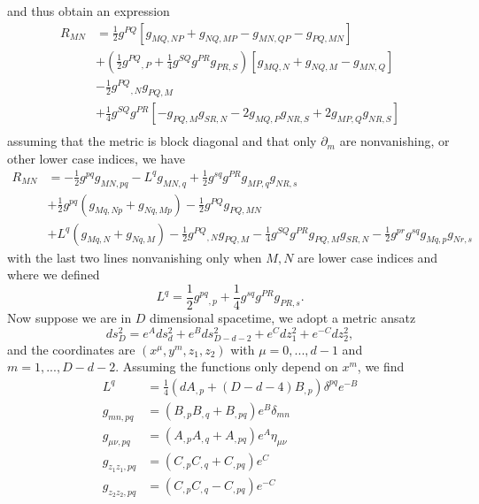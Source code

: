 and thus obtain an expression
\begin{equation}
\begin{aligned}
R_{MN}
&= \frac{1}{2}g^{PQ}[g_{MQ,NP} + g_{NQ,MP} - g_{MN,QP} - g_{PQ,MN}]\\
&+(\frac{1}{2}g^{PQ}{}_{,P} + \frac{1}{4}g^{SQ}g^{PR}g_{PR,S})[g_{MQ,N} + g_{NQ,M} - g_{MN,Q}]\\
&-\frac{1}{2}g^{PQ}{}_{,N}g_{PQ,M}\\
&+\frac{1}{4}g^{SQ}g^{PR}[-g_{PQ,M}g_{SR,N} - 2g_{MQ,P}g_{NR,S} +2g_{MP,Q}g_{NR,S}]\\
\end{aligned}
\end{equation}
assuming that the metric is block diagonal and that only $\partial_m$ are nonvanishing, or other lower case indices, we have
\begin{equation}
\begin{aligned}
R_{MN} &=
-\frac{1}{2}g^{pq}g_{MN,pq}
-L^qg_{MN,q}
+\frac{1}{2}g^{sq}g^{PR}g_{MP,q}g_{NR,s}\\
&+\frac{1}{2}g^{pq}(g_{Mq,Np}+g_{Nq,Mp})-\frac{1}{2}g^{PQ}g_{PQ,MN}\\
&+L^q(g_{Mq,N}+g_{Nq,M})
-\frac{1}{2}g^{PQ}{}_{,N}g_{PQ,M}
-\frac{1}{4}g^{SQ}g^{PR}g_{PQ,M}g_{SR,N}-\frac{1}{2}g^{pr}g^{sq}g_{Mq,p}g_{Nr,s}
\end{aligned}
\end{equation}
with the last two lines nonvanishing only when $M,N$ are lower case indices and where we defined
\begin{equation}
L^q = \frac{1}{2}g^{pq}{}_{,p} + \frac{1}{4}g^{sq}g^{PR}g_{PR,s}.
\end{equation}
Now suppose we are in $D$ dimensional spacetime, we adopt a metric ansatz
\begin{equation}
ds_D^2 = e^A ds_d^2 + e^B ds_{D-d-2}^2 + e^C dz_1^2 + e^{-C} dz_2^2,
\end{equation}
and the coordinates are $(x^{\mu}, y^m, z_1, z_2)$ with $\mu = 0,...,d-1$ and $m = 1,...,D-d-2$.
Assuming the functions only depend on $x^m$, we find
\begin{align}
L^q 
&=
\frac{1}{4}\left(
    dA_{,p} + (D-d-4)B_{,p}
\right)\delta^{pq}e^{-B}\\
g_{mn,pq} 
&= (B_{,p}B_{,q} + B_{,pq})e^{B}\delta_{mn}\\
g_{\mu\nu,pq} 
&= (A_{,p}A_{,q} + A_{,pq})e^{A}\eta_{\mu\nu}\\
g_{z_1 z_1,pq} 
&= (C_{,p}C_{,q} + C_{,pq})e^{C}\\
g_{z_2 z_2,pq} 
&= (C_{,p}C_{,q} - C_{,pq})e^{-C}
\end{align}
